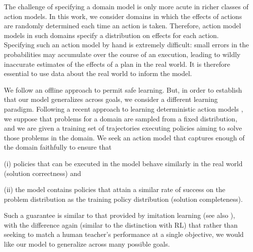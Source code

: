 \documentclass[letterpaper]{article} %
\begin{document}
The challenge of specifying a domain model is only more acute in richer classes of action models. 
In this work, we consider domains in which the effects of actions are randomly determined each time an action is taken. Therefore, action model models in such domains specify a distribution on effects for each action. 
Specifying such an action model by hand is extremely difficult: small errors in the probabilities may accumulate over the course of an execution, leading to wildly inaccurate estimates of the effects of a plan in the real world. 
It is therefore essential to use data about the real world to inform the model.



 

We follow an offline approach to permit safe learning. But, in order to establish that our model generalizes across goals, we consider a different learning paradigm. 
Following a recent approach to learning deterministic action models \cite{stern2017efficientAndSafe,juba2021kr}, we suppose that problems for a domain are sampled from a fixed distribution, and we are given a training set of trajectories executing policies aiming to solve those problems in the domain.
We seek an action model that captures enough of the domain faithfully to ensure that
\begin{compactenum}
    \item[(i)] policies that can be executed in the model behave similarly in the real world (solution correctness) and 
    \item[(ii)] the model contains policies that attain a similar rate of success on the problem distribution as the training policy distribution (solution completeness).
\end{compactenum}
Such a guarantee is similar to that provided by imitation learning \cite{osa2018algorithmic} (see also \cite{khardon1999l2act}), with the difference again (similar to the distinction with RL) that rather than seeking to match a human teacher's performance at a single objective, we would like our model to generalize across many possible goals.
\end{document}
